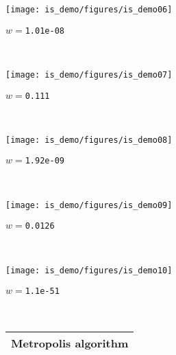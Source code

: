 \documentclass[25pt,landscape]{foils}
\newcommand{\Gray}{\textcolor{mygray}}
\newcommand{\myfoilhead}[1]{
\newpage
\vspace*{-1cm}
\Gray{
\begin{tabular*}{\textwidth}{l}
{\bf \Huge #1} \\
\bottomrule
\end{tabular*}}}
\begin{document}
\vfill

\begin{minipage}{0.19\linewidth}\texttt{[image: is\_demo/figures/is\_demo06]}
\small \centerline{$w=$\texttt{1.01e-08}}\\
\end{minipage}
\begin{minipage}{0.19\linewidth}\texttt{[image: is\_demo/figures/is\_demo07]}
\small \centerline{$w=$\texttt{0.111}}\\
\end{minipage}
\begin{minipage}{0.19\linewidth}\texttt{[image: is\_demo/figures/is\_demo08]}
\small \centerline{$w=$\texttt{1.92e-09}}\\
\end{minipage}
\begin{minipage}{0.19\linewidth}\texttt{[image: is\_demo/figures/is\_demo09]}
\small \centerline{$w=$\texttt{0.0126}}\\
\end{minipage}
\begin{minipage}{0.19\linewidth}\texttt{[image: is\_demo/figures/is\_demo10]}
\small \centerline{$w=$\texttt{1.1e-51}}\\
\end{minipage}

\vfill

\myfoilhead{Metropolis algorithm}

\vfill
\end{document}

